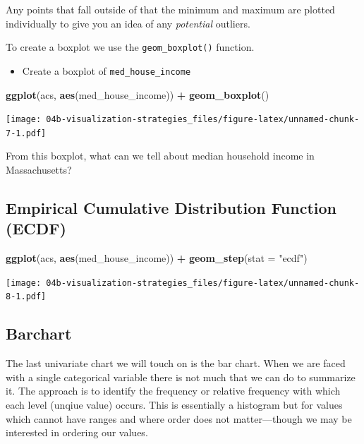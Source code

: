 \documentclass[
]{book}
\newenvironment{Shaded}{\begin{snugshade}}{\end{snugshade}}
\newcommand{\DataTypeTok}[1]{\textcolor[rgb]{0.13,0.29,0.53}{#1}}
\newcommand{\KeywordTok}[1]{\textcolor[rgb]{0.13,0.29,0.53}{\textbf{#1}}}
\newcommand{\NormalTok}[1]{#1}
\newcommand{\OperatorTok}[1]{\textcolor[rgb]{0.81,0.36,0.00}{\textbf{#1}}}
\newcommand{\StringTok}[1]{\textcolor[rgb]{0.31,0.60,0.02}{#1}}
\providecommand{\tightlist}{%
  \setlength{\itemsep}{0pt}\setlength{\parskip}{0pt}}
\begin{document}
Any points that fall outside of that the minimum and maximum are plotted individually to give you an idea of any \emph{potential} outliers.

To create a boxplot we use the \texttt{geom\_boxplot()} function.

\begin{itemize}
\tightlist
\item
  Create a boxplot of \texttt{med\_house\_income}
\end{itemize}

\begin{Shaded}
\begin{Highlighting}[]
\KeywordTok{ggplot}\NormalTok{(acs, }\KeywordTok{aes}\NormalTok{(med\_house\_income)) }\OperatorTok{+}
\StringTok{  }\KeywordTok{geom\_boxplot}\NormalTok{() }
\end{Highlighting}
\end{Shaded}

\texttt{[image: 04b-visualization-strategies\_files/figure-latex/unnamed-chunk-7-1.pdf]}

From this boxplot, what can we tell about median household income in Massachusetts?

\hypertarget{empirical-cumulative-distribution-function-ecdf}{%
\subsection{Empirical Cumulative Distribution Function (ECDF)}\label{empirical-cumulative-distribution-function-ecdf}}

\begin{Shaded}
\begin{Highlighting}[]
\KeywordTok{ggplot}\NormalTok{(acs, }\KeywordTok{aes}\NormalTok{(med\_house\_income)) }\OperatorTok{+}
\StringTok{  }\KeywordTok{geom\_step}\NormalTok{(}\DataTypeTok{stat =} \StringTok{"ecdf"}\NormalTok{)}
\end{Highlighting}
\end{Shaded}

\texttt{[image: 04b-visualization-strategies\_files/figure-latex/unnamed-chunk-8-1.pdf]}

\hypertarget{barchart}{%
\subsection{Barchart}\label{barchart}}

The last univariate chart we will touch on is the bar chart. When we are faced with a single categorical variable there is not much that we can do to summarize it. The approach is to identify the frequency or relative frequency with which each level (unqiue value) occurs. This is essentially a histogram but for values which cannot have ranges and where order does not matter---though we may be interested in ordering our values.
\end{document}
